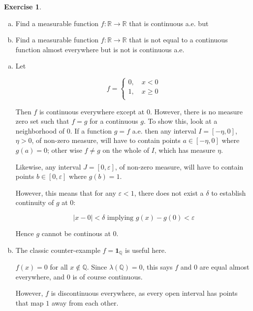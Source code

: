\documentclass[11pt,oneside]{article}
\numberwithin{equation}{section}
\theoremstyle{definition}
\newtheorem{exercise}{Exercise}
\def\RR{\mathbb{R}}
\def\QQ{\mathbb{Q}}
\def\one{\mathbf{1}}
\begin{document}
\begin{exercise}
  \begin{enumerate}[(a)]
  \item
    Find a measurable function $f: \RR \to \RR$ that is continuous
    a.e. but 
  \item
    Find a measurable function $f: \RR \to \RR$ that is not equal to a
    continuous function almost everywhere but is not is continuous a.e.
  \end{enumerate}
\end{exercise}
\begin{solution}
  \begin{enumerate}[(a)]
  \item
    Let

    \[
    f = \begin{cases}
      0, \quad x < 0 \\
      1, \quad x \geq 0\\
    \end{cases}
    \]

    Then $f$ is continuous everywhere except at 0.  However, there is
    no measure zero set such that $f = g$ for a continuous $g$.  To
    show this, look at a neighborhood of $0$.  If a function $g = f$
    a.e. then any interval $I = [-\eta, 0]$, $\eta > 0$, of non-zero measure,
    will have to contain points $a \in [ -\eta, 0]$ where $g(a) = 0$; other
    wise $f \neq g$ on the whole of $I$, which has measure $\eta$.

    Likewise, any interval $J = [0, \varepsilon]$, of non-zero measure, will
    have to contain points $b \in [0, \varepsilon]$ where $g(b) = 1$.

    However, this means that for any $ \varepsilon < 1$, there does not exist a
    $\delta$ to establish continuity of $g$ at $0$:

    \[
    | x - 0 | < \delta \textrm{ implying } g(x) - g(0) < \varepsilon
    \]

    Hence $g$ cannot be continous at 0.  
    
    
  \item
    The classic counter-example $ f = \one_{\QQ}$ is useful here.

    $f(x) = 0$ for all $x \notin \QQ$.  Since $\lambda(\QQ) = 0$, this
    says $f$ and $0$ are equal almost everywhere, and $0$ is of course
    continuous.

    However, $f$ is discontinuous everywhere, as every open interval has
    points that map $1$ away from each other.  
    
  \end{enumerate}
\end{solution}
\end{document}
